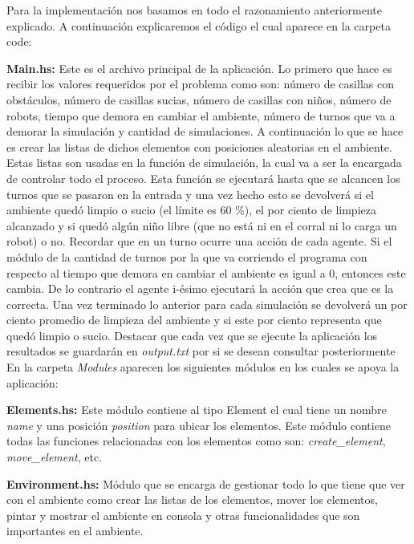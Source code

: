 \documentclass[a4paper,10pt]{article}
\begin{document}
Para la implementaci\'on nos basamos en todo el razonamiento anteriormente explicado. A continuaci\'on explicaremos el c\'odigo el cual aparece en la carpeta code:

\textbf{Main.hs: } Este es el archivo principal de la aplicaci\'on. Lo primero que hace es recibir los valores requeridos por el problema como son: n\'umero de casillas con obst\'aculos, n\'umero de casillas sucias, n\'umero de casillas con ni\~nos, n\'umero de robots, tiempo que demora en cambiar el ambiente, n\'umero de turnos que va a demorar la simulaci\'on y cantidad de simulaciones.
A continuaci\'on lo que se hace es crear las listas de dichos elementos con posiciones aleatorias en el ambiente. Estas listas son usadas en la funci\'on de simulaci\'on, la cual va a ser la encargada de controlar todo el proceso. Esta funci\'on se ejecutar\'a hasta que se alcancen los turnos que se pasaron en la entrada y una vez hecho esto se devolver\'a si el ambiente qued\'o limpio o sucio (el l\'imite es 60 \%), el por ciento de limpieza alcanzado y si qued\'o alg\'un ni\~no libre (que no est\'a ni en el corral ni lo carga un robot) o no. Recordar que en un turno ocurre una acci\'on de cada agente. Si el m\'odulo de la cantidad de turnos por la que va corriendo el programa con respecto al tiempo que demora en cambiar el ambiente es igual a 0, entonces este cambia. De lo contrario el agente i-\'esimo ejecutar\'a la acci\'on que crea que es la correcta. 
Una vez terminado lo anterior para cada simulaci\'on se devolver\'a un por ciento promedio de limpieza del ambiente y si este por ciento representa que qued\'o limpio o sucio.
Destacar que cada vez que se ejecute la aplicaci\'on los resultados se guardar\'an en \textit{output.txt} por si se desean consultar posteriormente\\

En la carpeta \textit{Modules} aparecen los siguientes m\'odulos en los cuales se apoya la aplicaci\'on:

\textbf{Elements.hs: } Este m\'odulo contiene al tipo Element el cual tiene un nombre \textit{name} y una posici\'on \textit{position} para ubicar los elementos. Este m\'odulo contiene todas las funciones relacionadas con los elementos como son: \textit{create\_element}, \textit{move\_element}, etc.

\textbf{Environment.hs: } M\'odulo que se encarga de gestionar todo lo que tiene que ver con el ambiente como crear las listas de los elementos, mover los elementos, pintar y mostrar el ambiente en consola y otras funcionalidades que son importantes en el ambiente.
\end{document}
